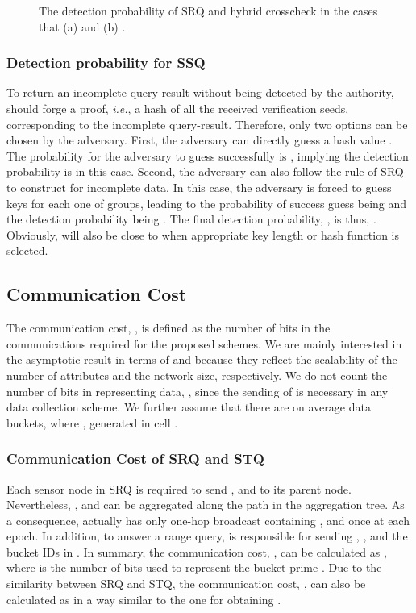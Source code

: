 \documentclass[conference]{IEEEtran}
\begin{document}
\begin{figure}[h]
\centering
{}
\caption{\scriptsize The detection probability of SRQ and hybrid crosscheck in the cases that (a)  and (b) .} \label{fig: detection probability}
\end{figure}

\subsubsection{Detection probability for SSQ}\label{sec: Detection probability of SSQ}
To return an incomplete query-result without being detected by the authority,  should forge a proof, \emph{i.e.}, a hash  of all the received verification seeds, corresponding to the incomplete query-result. Therefore, only two options can be chosen by the adversary. First, the adversary can directly guess a hash value . The probability for the adversary to guess successfully is , implying the detection probability  is  in this case. Second, the adversary can also follow the rule of SRQ to construct  for incomplete data. In this case, the adversary is forced to guess  keys for each one of  groups, leading to the probability of success guess being  and the detection probability being . The final detection probability, , is thus, . Obviously,  will also be close to  when appropriate key length or hash function is selected.

\subsection{Communication Cost}\label{sec: Communication Cost}
The communication cost, , is defined as the number of bits in the communications required for the proposed schemes. We are mainly interested in the asymptotic result in terms of  and  because they reflect the scalability of the number of attributes and the network size, respectively. We do not count the number of bits in representing data, , since the sending of  is necessary in any data collection scheme. We further assume that there are on average  data buckets, where , generated in cell .

\subsubsection{Communication Cost of SRQ and STQ} Each sensor node  in SRQ is required to send , and  to its parent node. Nevertheless, , and  can be aggregated along the path in the aggregation tree. As a consequence,  actually has only one-hop broadcast containing , and  once at each epoch. In addition, to answer a range query,  is responsible for sending , , and the bucket IDs in . In summary, the communication cost, , can be calculated as , where  is the number of bits used to represent the bucket prime . Due to the similarity between SRQ and STQ, the communication cost, , can also be calculated as  in a way similar to the one for obtaining .
\end{document}
